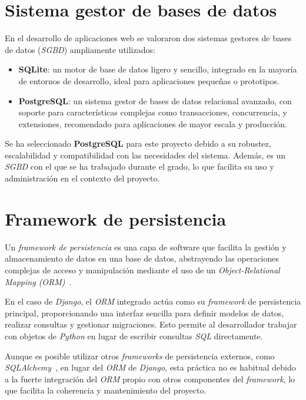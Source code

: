\section{Sistema gestor de bases de datos}

En el desarrollo de aplicaciones web se valoraron dos sistemas gestores de bases de datos (\textit{SGBD}) ampliamente utilizados:

\begin{itemize}
    \item \textbf{SQLite}: un motor de base de datos ligero y sencillo, integrado en la mayoría de entornos de desarrollo, ideal para aplicaciones pequeñas o prototipos.~\cite{web:sqlite}
    \item \textbf{PostgreSQL}: un sistema gestor de bases de datos relacional avanzado, con soporte para características complejas como transacciones, concurrencia, y extensiones, recomendado para aplicaciones de mayor escala y producción.~\cite{web:postgresql}
\end{itemize}

Se ha seleccionado \textbf{PostgreSQL} para este proyecto debido a su robustez, escalabilidad y compatibilidad con las 
necesidades del sistema. Además, es un \textit{SGBD} con el que se ha trabajado durante el grado, lo que facilita su uso y 
administración en el contexto del proyecto.

\section{Framework de persistencia}

Un \textit{framework de persistencia} es una capa de software que facilita la gestión y almacenamiento de datos en una base de datos, 
abstrayendo las operaciones complejas de acceso y manipulación mediante el uso de un \textit{Object-Relational Mapping (ORM)}~\cite{web:django-orm}.

En el caso de \textit{Django}, el \textit{ORM} integrado actúa como su \textit{framework} de persistencia principal, proporcionando una interfaz sencilla para definir 
modelos de datos, realizar consultas y gestionar migraciones. Esto permite al desarrollador trabajar con objetos de \textit{Python} en lugar de escribir consultas \textit{SQL} directamente.

Aunque es posible utilizar otros \textit{frameworks} de persistencia externos, como \textit{SQLAlchemy}~\cite{web:sqlalchemy}, en lugar del \textit{ORM} de \textit{Django}, esta práctica no es habitual 
debido a la fuerte integración del \textit{ORM} propio con otros componentes del \textit{framework}, lo que facilita la coherencia y mantenimiento del proyecto.

